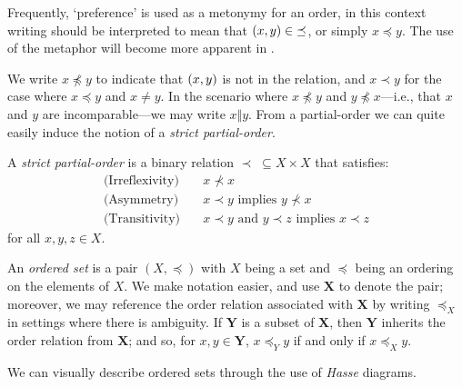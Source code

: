 Frequently, `preference' is used as a metonymy for an order, in this context writing  should be interpreted to mean that $(x,y) \in \; \preceq$, or simply $x \preceq y$. The use of the metaphor will become more apparent in . 

We write $x \npreceq y$ to indicate that $(x,y)$ is not in the relation, and $x \prec y$ for the case where $x\preceq y$ and $x \not = y$. In the scenario where $x \not \preceq y$ and $y \not \preceq x$---i.e., that $x$ and $y$ are incomparable---we may write $x \Vert y$. From a partial-order we can quite easily induce the notion of a \emph{strict partial-order}.

\begin{definition}
  \label{definition:strict-partial-order}
  A \textit{strict partial-order}  is a binary relation $\prec \; \subseteq X \times X$ that satisfies:
  \begin{align}
     \text{(Irreflexivity)} \quad & x \nprec x \\
     \text{(Asymmetry)} \quad & x \prec y \text{ implies } y \nprec x \\
     \text{(Transitivity)} \quad & x \prec y \text{ and } y \prec z \text{ implies } x \prec z
  \end{align}
  for all $x,y,z \in X$.
\end{definition}

An \textit{ordered set} is a pair $(X, \preceq)$ with $X$ being a set and $\preceq$ being an ordering on the elements of $X$. We make notation easier, and use $\mathbf{X}$ to denote the pair; moreover, we may reference the order relation associated with $\mathbf{X}$ by writing $\preceq_X$ in settings where there is ambiguity. If $\mathbf{Y}$ is a subset of $\mathbf{X}$, then $\mathbf{Y}$ inherits the order relation from $\mathbf{X}$; and so, for $x,y \in \mathbf{Y}$, $x \preceq_Y y$ if and only if $x \preceq_X y$.

We can visually describe ordered sets through the use of \textit{Hasse} diagrams.

